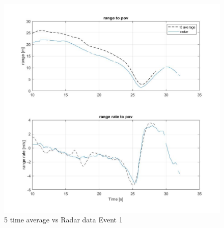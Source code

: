 \begin{figure}[H]
    \centering
    \includegraphics[width=\textwidth]{Figures/user_average_comparison.jpg}
    \caption{5 time average vs Radar data Event 1}
    \label{fig:average_vs_radar}
\end{figure}


